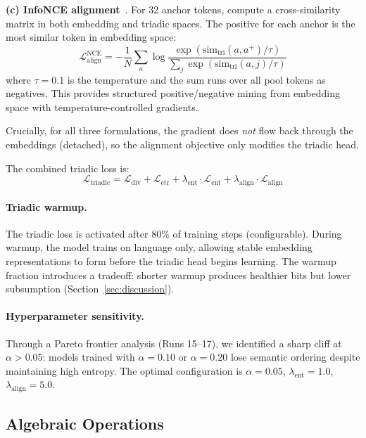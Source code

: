 \documentclass[11pt,a4paper]{article}
\newcommand{\loss}[1]{\mathcal{L}_{\text{#1}}}
\begin{document}
\begin{enumerate}
    \textbf{(c) InfoNCE alignment}~\citep{oord2018cpc}. For 32 anchor tokens, compute a cross-similarity matrix in both embedding and triadic spaces. The positive for each anchor is the most similar token in embedding space:
    \begin{equation}
        \loss{align}^{\text{NCE}} = -\frac{1}{N} \sum_a \log \frac{\exp(\text{sim}_{\text{tri}}(a, a^+) / \tau)}{\sum_{j} \exp(\text{sim}_{\text{tri}}(a, j) / \tau)}
        \label{eq:align_infonce}
    \end{equation}
    where $\tau = 0.1$ is the temperature and the sum runs over all pool tokens as negatives. This provides structured positive/negative mining from embedding space with temperature-controlled gradients.

    Crucially, for all three formulations, the gradient does \emph{not} flow back through the embeddings (detached), so the alignment objective only modifies the triadic head.
\end{enumerate}

The combined triadic loss is:
\begin{equation}
    \loss{triadic} = \loss{div} + \loss{ctr} + \lambda_{\text{ent}} \cdot \loss{ent} + \lambda_{\text{align}} \cdot \loss{align}
\end{equation}

\paragraph{Triadic warmup.} The triadic loss is activated after 80\% of training steps (configurable). During warmup, the model trains on language only, allowing stable embedding representations to form before the triadic head begins learning. The warmup fraction introduces a tradeoff: shorter warmup produces healthier bits but lower subsumption (Section~\ref{sec:discussion}).

\paragraph{Hyperparameter sensitivity.} Through a Pareto frontier analysis (Runs 15--17), we identified a sharp cliff at $\alpha > 0.05$: models trained with $\alpha = 0.10$ or $\alpha = 0.20$ lose semantic ordering despite maintaining high entropy. The optimal configuration is $\alpha = 0.05$, $\lambda_{\text{ent}} = 1.0$, $\lambda_{\text{align}} = 5.0$.


\subsection{Algebraic Operations}
\label{sec:algebra}
\end{document}
